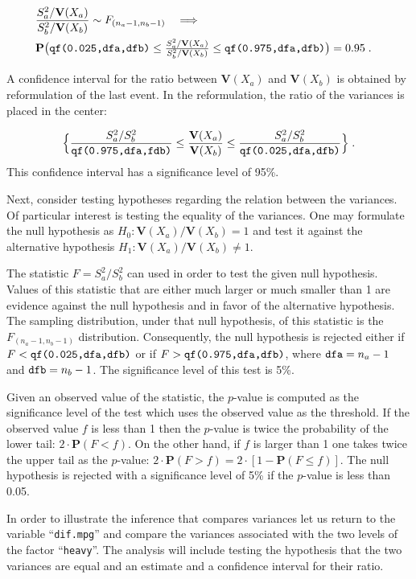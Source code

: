 \documentclass[]{krantz}
\newcommand{\Prob}{\mathbf{P}}
\newcommand{\Var}{\mathbf{V}}
\theoremstyle{definition}
\theoremstyle{definition}
\theoremstyle{definition}
\theoremstyle{remark}
\begin{document}
\[\begin{aligned}
\lefteqn{\frac{S_a^2/\Var(X_a)}{S_b^2/\Var(X_b)} \sim F_{(n_a-1,n_b-1)} \quad \Longrightarrow }\\ & \Prob \big( \mbox{\texttt{qf(0.025,dfa,dfb)}} \leq  {\textstyle \frac{S_a^2/\Var(X_a)}{S_b^2/\Var(X_b)}}  \leq \mbox{\texttt{qf(0.975,dfa,dfb)}} \big) = 0.95\;.\end{aligned}\]

A confidence interval for the ratio between \(\Var(X_a)\) and \(\Var(X_b)\)
is obtained by reformulation of the last event. In the reformulation,
the ratio of the variances is placed in the center:

\[\Big\{\frac{S_a^2/S_b^2}{\mbox{\texttt{qf(0.975,dfa,fdb)}}} \leq  \frac{\Var(X_a)}{\Var(X_b)}  \leq \frac{S_a^2/S_b^2}{\mbox{\texttt{qf(0.025,dfa,dfb)}}}\Big\}\;.\]
This confidence interval has a significance level of 95\%.

Next, consider testing hypotheses regarding the relation between the
variances. Of particular interest is testing the equality of the
variances. One may formulate the null hypothesis as
\(H_0: \Var(X_a)/\Var(X_b) = 1\) and test it against the alternative
hypothesis \(H_1: \Var(X_a)/\Var(X_b) \not = 1\).

The statistic \(F = S_a^2/S_b^2\) can used in order to test the given null
hypothesis. Values of this statistic that are either much larger or much
smaller than 1 are evidence against the null hypothesis and in favor of
the alternative hypothesis. The sampling distribution, under that null
hypothesis, of this statistic is the \(F_{(n_a-1,n_b-1)}\) distribution.
Consequently, the null hypothesis is rejected either if
\(F < \mbox{\texttt{qf(0.025,dfa,dfb)}}\) or if
\(F >\mbox{\texttt{qf(0.975,dfa,dfb)}}\), where
\(\mbox{\texttt{dfa}} = n_a - 1\) and \(\mbox{\texttt{dfb}} = n_b - 1\). The
significance level of this test is 5\%.

Given an observed value of the statistic, the \(p\)-value is computed as
the significance level of the test which uses the observed value as the
threshold. If the observed value \(f\) is less than 1 then the \(p\)-value
is twice the probability of the lower tail: \(2\cdot \Prob(F < f)\). On
the other hand, if \(f\) is larger than 1 one takes twice the upper tail
as the \(p\)-value: \(2\cdot \Prob(F > f) = 2\cdot [1-\Prob(F \leq f)]\).
The null hypothesis is rejected with a significance level of 5\% if the
\(p\)-value is less than 0.05.

In order to illustrate the inference that compares variances let us
return to the variable ``\texttt{dif.mpg}'' and compare the variances associated
with the two levels of the factor ``\texttt{heavy}''. The analysis will include
testing the hypothesis that the two variances are equal and an estimate
and a confidence interval for their ratio.
\end{document}
